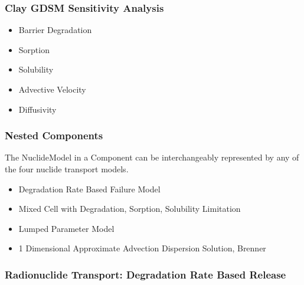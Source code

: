 
\begin{frame}
\frametitle{Clay GDSM Sensitivity Analysis}
\footnotesize{
\begin{itemize}
\item Barrier Degradation
\item Sorption
\item Solubility
\item Advective Velocity
\item Diffusivity
\end{itemize}

}
\end{frame}

\begin{frame}
  \frametitle{Nested Components}
  The NuclideModel in a Component can be interchangeably represented by any of 
  the four nuclide transport models. 
    \begin{itemize}
      \item Degradation Rate Based Failure Model
      \item Mixed Cell with Degradation, Sorption, Solubility Limitation
      \item Lumped Parameter Model
      \item 1 Dimensional Approximate Advection Dispersion Solution, Brenner 
      \cite{brenner_diffusion_1962}
    \end{itemize}
\end{frame}



%
%      

\begin{frame}
  \frametitle{Radionuclide Transport: Degradation Rate Based Release}
  
\end{frame}



